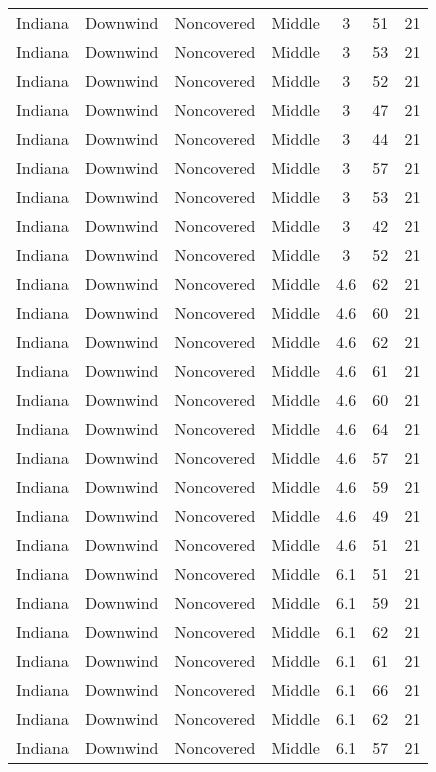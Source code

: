 \documentclass{article}
\begin{document}
\begin{longtable}[H]{ccccccc}
Indiana & Downwind & Noncovered & Middle & 3    & 51 & 21 \\
Indiana & Downwind & Noncovered & Middle & 3    & 53 & 21 \\
Indiana & Downwind & Noncovered & Middle & 3    & 52 & 21 \\
Indiana & Downwind & Noncovered & Middle & 3    & 47 & 21 \\
Indiana & Downwind & Noncovered & Middle & 3    & 44 & 21 \\
Indiana & Downwind & Noncovered & Middle & 3    & 57 & 21 \\
Indiana & Downwind & Noncovered & Middle & 3    & 53 & 21 \\
Indiana & Downwind & Noncovered & Middle & 3    & 42 & 21 \\
Indiana & Downwind & Noncovered & Middle & 3    & 52 & 21 \\
Indiana & Downwind & Noncovered & Middle & 4.6  & 62 & 21 \\
Indiana & Downwind & Noncovered & Middle & 4.6  & 60 & 21 \\
Indiana & Downwind & Noncovered & Middle & 4.6  & 62 & 21 \\
Indiana & Downwind & Noncovered & Middle & 4.6  & 61 & 21 \\
Indiana & Downwind & Noncovered & Middle & 4.6  & 60 & 21 \\
Indiana & Downwind & Noncovered & Middle & 4.6  & 64 & 21 \\
Indiana & Downwind & Noncovered & Middle & 4.6  & 57 & 21 \\
Indiana & Downwind & Noncovered & Middle & 4.6  & 59 & 21 \\
Indiana & Downwind & Noncovered & Middle & 4.6  & 49 & 21 \\
Indiana & Downwind & Noncovered & Middle & 4.6  & 51 & 21 \\
Indiana & Downwind & Noncovered & Middle & 6.1  & 51 & 21 \\
Indiana & Downwind & Noncovered & Middle & 6.1  & 59 & 21 \\
Indiana & Downwind & Noncovered & Middle & 6.1  & 62 & 21 \\
Indiana & Downwind & Noncovered & Middle & 6.1  & 61 & 21 \\
Indiana & Downwind & Noncovered & Middle & 6.1  & 66 & 21 \\
Indiana & Downwind & Noncovered & Middle & 6.1  & 62 & 21 \\
Indiana & Downwind & Noncovered & Middle & 6.1  & 57 & 21 \\

\end{longtable}
\end{document}
